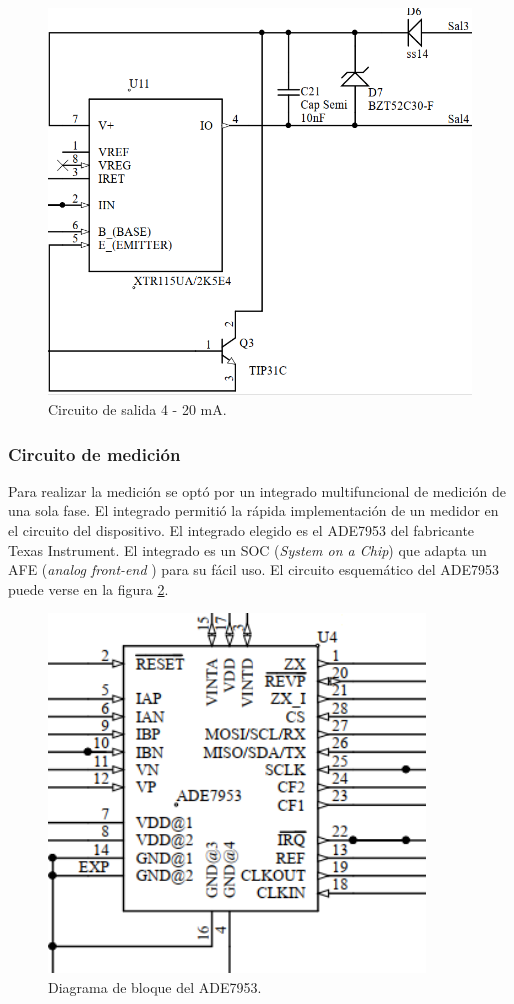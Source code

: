 \begin{figure}[!htb]
	\centering
	\includegraphics[width=120mm,keepaspectratio]{Figures/salida420.png}
	\caption{Circuito de salida 4 - 20 mA.}
	\label{fig:rele1equem}
\end{figure}


\subsubsection{Circuito de medición}

Para realizar la medición se optó por un integrado multifuncional de medición de una sola fase. El  integrado permitió la rápida implementación de un medidor en el circuito del dispositivo. El integrado elegido es el ADE7953 del fabricante Texas Instrument. El integrado es un SOC (\textit{System on a Chip}) que adapta un AFE (\textit{analog front-end} ) para su fácil uso. El circuito esquemático del ADE7953 puede verse en la  figura \ref{fig:ade79esquem}.

\begin{figure}[!htb]
	\centering
	\includegraphics[width=100mm,keepaspectratio]{Figures/ade7953.png}
	\caption{Diagrama de bloque del ADE7953.}
	\label{fig:ade79esquem}
\end{figure}

